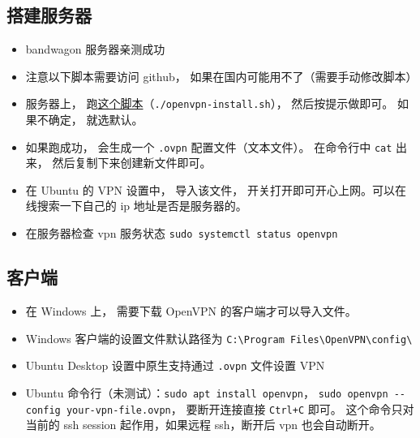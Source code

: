 
\begin{issues}
\issueDraft
\end{issues}

\subsection{搭建服务器}
\begin{itemize}
\item bandwagon 服务器亲测成功
\item 注意以下脚本需要访问 github， 如果在国内可能用不了（需要手动修改脚本）
\item 服务器上， 跑\href{https://github.com/MacroUniverse/openvpn-install/blob/master/openvpn-install.sh}{这个脚本}（\verb`./openvpn-install.sh`）， 然后按提示做即可。 如果不确定， 就选默认。
\item 如果跑成功， 会生成一个 \verb`.ovpn` 配置文件（文本文件）。 在命令行中 \verb`cat` 出来， 然后复制下来创建新文件即可。
\item 在 Ubuntu 的 VPN 设置中， 导入该文件， 开关打开即可开心上网。可以在线搜索一下自己的 ip 地址是否是服务器的。
\item 在服务器检查 vpn 服务状态 \verb`sudo systemctl status openvpn`
\end{itemize}

\subsection{客户端}
\begin{itemize}
\item 在 Windows 上， 需要下载 OpenVPN 的客户端才可以导入文件。
\item Windows 客户端的设置文件默认路径为 \verb`C:\Program Files\OpenVPN\config\`
\item Ubuntu Desktop 设置中原生支持通过 \verb`.ovpn` 文件设置 VPN
\item Ubuntu 命令行（未测试）：\verb`sudo apt install openvpn`， \verb`sudo openvpn --config your-vpn-file.ovpn`， 要断开连接直接 \verb`Ctrl+C` 即可。 这个命令只对当前的 ssh session 起作用，如果远程 ssh，断开后 vpn 也会自动断开。
\end{itemize}
